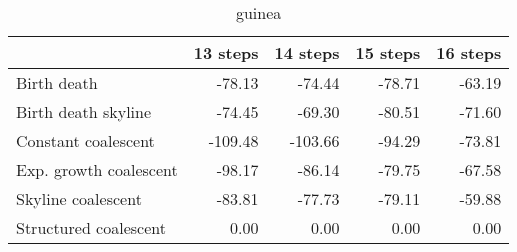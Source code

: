 \begin{table}[ht]
\centering
\begin{tabular}{lrrrr}
  \hline
 & 13 steps & 14 steps & 15 steps & 16 steps \\ 
  \hline
Birth death & -78.13 & -74.44 & -78.71 & -63.19 \\ 
  Birth death skyline & -74.45 & -69.30 & -80.51 & -71.60 \\ 
  Constant coalescent & -109.48 & -103.66 & -94.29 & -73.81 \\ 
  Exp. growth coalescent & -98.17 & -86.14 & -79.75 & -67.58 \\ 
  Skyline coalescent & -83.81 & -77.73 & -79.11 & -59.88 \\ 
  Structured coalescent & 0.00 & 0.00 & 0.00 & 0.00 \\ 
   \hline
\end{tabular}
\caption{guinea} 
\label{table:guinea_likelihoods}
\end{table}
